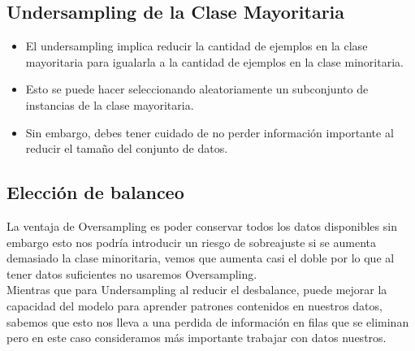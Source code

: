 \subsection{Undersampling de la Clase Mayoritaria}

\begin{itemize}
    \item El undersampling implica reducir la cantidad de ejemplos en la clase mayoritaria para igualarla a la cantidad de ejemplos en la clase minoritaria.
    \item Esto se puede hacer seleccionando aleatoriamente un subconjunto de instancias de la clase mayoritaria.
    \item Sin embargo, debes tener cuidado de no perder información importante al reducir el tamaño del conjunto de datos.
\end{itemize}


\subsection{Elección de balanceo}

La ventaja de Oversampling es poder conservar todos los datos disponibles sin embargo 
esto nos podría introducir un riesgo de sobreajuste si se aumenta demasiado la clase 
minoritaria, vemos que aumenta casi el doble por lo que al tener datos suficientes no 
usaremos Oversampling.\\ 

Mientras que para Undersampling al reducir el desbalance, puede mejorar la capacidad del 
modelo para aprender patrones contenidos en nuestros datos, sabemos que esto nos lleva a una 
perdida de información en filas que se eliminan pero en este caso consideramos más importante 
trabajar con datos nuestros.

